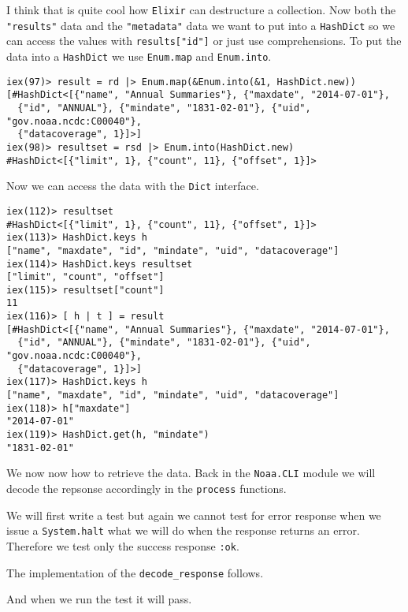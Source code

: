 \documentclass[10pt, a4paper]{article}
\newcommand{\includecode}[3]{}
\begin{document}
I think that is quite cool how \texttt{Elixir} can destructure a collection.
Now both the \texttt{"results"} data and the \texttt{"metadata"} data we 
want to put into a \texttt{HashDict} so we can access the values with
\texttt{results["id"]} or just use comprehensions. To put the data into a 
\texttt{HashDict} we use \texttt{Enum.map} and \texttt{Enum.into}.

\begin{verbatim}
iex(97)> result = rd |> Enum.map(&Enum.into(&1, HashDict.new))
[#HashDict<[{"name", "Annual Summaries"}, {"maxdate", "2014-07-01"},
  {"id", "ANNUAL"}, {"mindate", "1831-02-01"}, {"uid", "gov.noaa.ncdc:C00040"},
  {"datacoverage", 1}]>]
iex(98)> resultset = rsd |> Enum.into(HashDict.new)
#HashDict<[{"limit", 1}, {"count", 11}, {"offset", 1}]> 
\end{verbatim}

Now we can access the data with the \texttt{Dict} interface.

\begin{verbatim}
iex(112)> resultset
#HashDict<[{"limit", 1}, {"count", 11}, {"offset", 1}]>
iex(113)> HashDict.keys h
["name", "maxdate", "id", "mindate", "uid", "datacoverage"]
iex(114)> HashDict.keys resultset
["limit", "count", "offset"]
iex(115)> resultset["count"]
11
iex(116)> [ h | t ] = result
[#HashDict<[{"name", "Annual Summaries"}, {"maxdate", "2014-07-01"},
  {"id", "ANNUAL"}, {"mindate", "1831-02-01"}, {"uid", "gov.noaa.ncdc:C00040"},
  {"datacoverage", 1}]>]
iex(117)> HashDict.keys h
["name", "maxdate", "id", "mindate", "uid", "datacoverage"]
iex(118)> h["maxdate"]
"2014-07-01"
iex(119)> HashDict.get(h, "mindate")
"1831-02-01"
\end{verbatim}

We now now how to retrieve the data. Back in the \texttt{Noaa.CLI} module 
we will decode the repsonse accordingly in the \texttt{process} functions.

We will first write a test but again we cannot test for error response 
when we issue a \texttt{System.halt} what we will do when the response
returns an error. Therefore we test only the success response \texttt{:ok}.

\includecode{test/decode\_test.exs}{lst:decodetest}
            {listings/decode-test.exs}

The implementation of the \texttt{decode\_response} follows.

\includecode{lib/noaa/cli.ex}{lst:cli6}{listings/cli6.ex}

And when we run the test it will pass.
\end{document}
